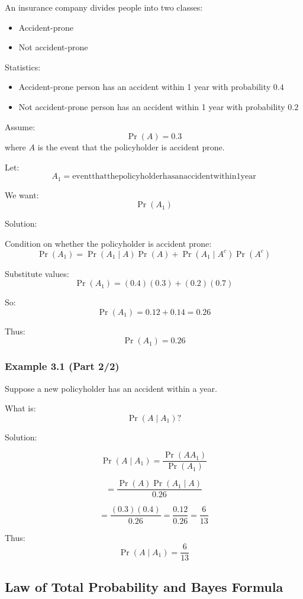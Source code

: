 \documentclass[12pt]{article}
\begin{document}
An insurance company divides people into two classes:
\begin{itemize}
    \item Accident-prone
    \item Not accident-prone
\end{itemize}

Statistics:
\begin{itemize}
    \item Accident-prone person has an accident within 1 year with probability $0.4$
    \item Not accident-prone person has an accident within 1 year with probability $0.2$
\end{itemize}

Assume:
\[
\Pr(A)=0.3
\]
where $A$ is the event that the policyholder is accident prone.

Let:
\[
A_1 = \mathrm{event that the policyholder has an accident within 1 year}
\]

We want:
\[
\Pr(A_1)
\]

Solution:

Condition on whether the policyholder is accident prone:
\[
\Pr(A_1)=\Pr(A_1\mid A)\Pr(A)+\Pr(A_1\mid A^c)\Pr(A^c)
\]

Substitute values:
\[
\Pr(A_1)=(0.4)(0.3)+(0.2)(0.7)
\]

So:
\[
\Pr(A_1)=0.12+0.14=0.26
\]

Thus:
\[
\Pr(A_1)=0.26
\]

\subsubsection*{Example 3.1 (Part 2/2)}

Suppose a new policyholder has an accident within a year.

What is:
\[
\Pr(A\mid A_1)?
\]

Solution:

\[
\Pr(A\mid A_1)=\frac{\Pr(AA_1)}{\Pr(A_1)}
\]

\[
=\frac{\Pr(A)\Pr(A_1\mid A)}{0.26}
\]

\[
=\frac{(0.3)(0.4)}{0.26}
=\frac{0.12}{0.26}
=\frac{6}{13}
\]

Thus:
\[
\Pr(A\mid A_1)=\frac{6}{13}
\]

\subsection{Law of Total Probability and Bayes Formula}
\end{document}
